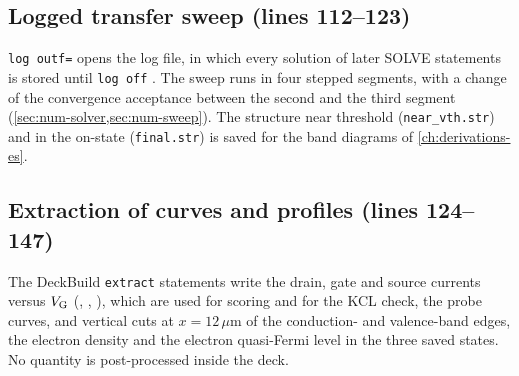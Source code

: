 \subsection{Logged transfer sweep (lines 112--123)}

\texttt{log outf=} opens the log file, in which every solution of later SOLVE statements is stored until \texttt{log off}
\citep[pp.~1299, 1301]{AtlasManual}. The sweep runs in four stepped segments, with a change of the convergence
acceptance between the second and the third segment (\cref{sec:num-solver,sec:num-sweep}). The structure near threshold
(\texttt{near\_vth.str}) and in the on-state (\texttt{final.str}) is saved for the band diagrams of
\cref{ch:derivations-es}.

\subsection{Extraction of curves and profiles (lines 124--147)}

The DeckBuild \texttt{extract} statements \citep{DeckBuildManual} write the drain, gate and source currents versus
$V_{\mathrm{G}}$ (, , ), which are used for scoring and for the KCL check, the probe
curves, and vertical cuts at $x = 12\,\mu$m of the conduction- and valence-band edges, the electron density and the
electron quasi-Fermi level in the three saved states. No quantity is post-processed inside the deck.

